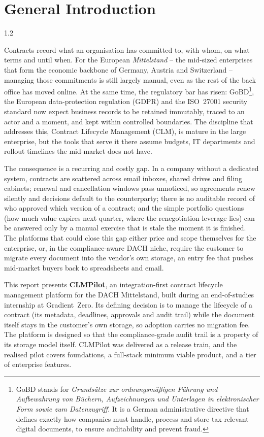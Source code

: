 \chapter*{General Introduction}
\begin{spacing}{1.2}

Contracts record what an
organisation has committed to, with whom, on what terms and until when. For
the European \textit{Mittelstand} -- the mid-sized enterprises that form the
economic backbone of Germany, Austria and Switzerland -- managing those
commitments is still largely manual, even as the rest of the
back office has moved online. At the same time, the regulatory bar has risen:
GoBD\footnote{GoBD stands for \textit{Grunds\"atze zur ordnungsm\"a\ss igen
F\"uhrung und Aufbewahrung von B\"uchern, Aufzeichnungen und Unterlagen in
elektronischer Form sowie zum Datenzugriff}. It is a German administrative
directive that defines exactly how companies must handle, process and store
tax-relevant digital documents, to ensure auditability and prevent fraud.},
the European data-protection regulation (GDPR) and the
ISO~27001 security standard now expect business records to be retained
immutably, traced to an actor and a moment, and kept within controlled
boundaries. The discipline that addresses this, Contract Lifecycle
Management (CLM), is mature in the large enterprise, but the tools that
serve it there assume budgets, IT departments and rollout timelines the
mid-market does not have.

The consequence is a recurring and costly gap. In a company without a
dedicated system, contracts are scattered across email inboxes, shared drives
and filing cabinets; renewal and cancellation windows pass unnoticed, so
agreements renew silently and decisions default to the counterparty; there is
no auditable record of who approved which version of a contract; and the
simple portfolio questions (how much value expires next quarter, where the
renegotiation leverage lies) can be answered only by a manual exercise that
is stale the moment it is finished. The platforms that could close this
gap either price and scope themselves for the enterprise, or, in the
compliance-aware DACH niche, require the customer to migrate every document
into the vendor's own storage, an entry fee that pushes mid-market buyers
back to spreadsheets and email.

This report presents \textbf{CLMPilot}, an integration-first contract
lifecycle management platform for the DACH Mittelstand, built during an
end-of-studies internship at Gradient~Zero. Its defining decision is to
manage the lifecycle of a contract (its metadata, deadlines, approvals and
audit trail) while the document itself stays in the customer's own storage,
so adoption carries no migration fee. The platform is designed so that the
compliance-grade audit trail is a property of its storage model itself.
CLMPilot was delivered as a release train, and the realised pilot covers
foundations, a full-stack minimum viable product, and a tier of enterprise
features.


\end{spacing}
